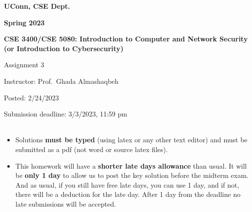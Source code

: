 \documentclass[12pt]{article}
\newcommand{\handout}[2]{
\renewcommand{\thepage}{\footnotesize CSE 3400/CSE 5850, #1, p. \arabic{page}}
\begin{center}

\noindent
{\bf UConn, CSE Dept.}

\noindent
{\bf Spring 2023}

\noindent
{\bf CSE 3400/CSE 5080: Introduction to Computer and Network Security \\(or Introduction to Cybersecurity)}
\end{center}

\begin{center}
{\Large #1}
\end{center}
}
\begin{document}
\handout{Assignment 3}{}

\noindent
{Instructor: Prof.~Ghada Almashaqbeh}

\noindent
{Posted: 2/24/2023}

\noindent
{Submission deadline: 3/3/2023, 11:59 pm} \\\\

\begin{itemize}
\item Solutions {\bf must be typed} (using latex or any other text editor) and must be submitted as a pdf (not word or source latex files).

\item This homework will have a \textbf{shorter late days allowance} than usual. It will be \textbf{only 1 day} to allow us to post the key solution before the midterm exam. And as usual, if you still have free late days, you can use 1 day, and if not, there will be a deduction for the late day. After 1 day from the deadline no late submissions will be accepted.
\end{itemize}
\end{document}
